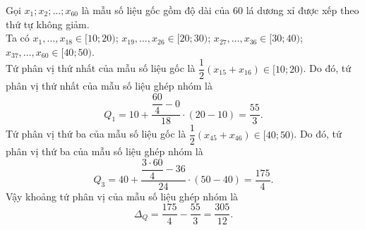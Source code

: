 \begin{ex}
{\begin{itemchoice}
			Gọi $x_1 ; x_2 ; \ldots ; x_{60}$ là mẫu số liệu gốc gồm độ dài của $60$ lá dương xỉ được xếp theo thứ tự không giảm.\\
			Ta có $x_1,\ldots, x_{18} \in[10;20)$; $x_{19}, \ldots, x_{26} \in[20;30)$; $x_{27}, \ldots, x_{36} \in[30;40)$;\\$x_{37}, \ldots, x_{60} \in[40;50)$.\\
			Tứ phân vị thứ nhất của mẫu số liệu gốc là $\dfrac{1}{2}\left(x_{15}+x_{16}\right) \in[10;20)$. Do đó, tứ phân vị thứ nhất của mẫu số liệu ghép nhóm là
			$$
			Q_1=10+\dfrac{\dfrac{60}{4}-0}{18} \cdot(20-10)=\dfrac{55}{3}.
			$$			
			Tứ phân vị thứ ba của mẫu số liệu gốc là $\dfrac{1}{2}\left(x_{45}+x_{46}\right) \in[40;50)$. Do đó, tứ phân vị thứ ba của mẫu số liệu ghép nhóm là
			$$
			Q_3=40+\dfrac{\dfrac{3\cdot60}{4}-36}{24} \cdot(50-40)=\dfrac{175}{4}.
			$$			
			Vậy khoảng tứ phân vị của mẫu số liệu ghép nhóm là
			$$
			\Delta_Q=\dfrac{175}{4}-\dfrac{55}{3}=\dfrac{305}{12}.
			$$
		\end{itemchoice}
	}
\end{ex}

